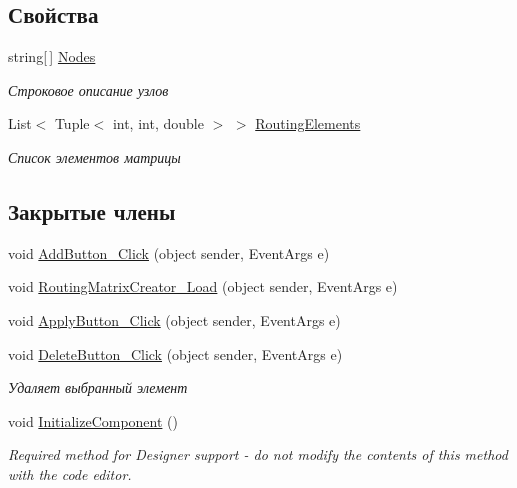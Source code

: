 \subsection*{Свойства}
\begin{DoxyCompactItemize}
\item 
string\mbox{[}$\,$\mbox{]} \hyperlink{class_desktop_network_analyzator_1_1_routing_matrix_creator_a3814334afe7686918cfe53e19464a3a7}{Nodes}
\begin{DoxyCompactList}\small\item\em Строковое описание узлов \end{DoxyCompactList}\item 
List$<$ Tuple$<$ int, int, double $>$ $>$ \hyperlink{class_desktop_network_analyzator_1_1_routing_matrix_creator_ad3dfc8b1d4eb526017b4515003533186}{Routing\+Elements}
\begin{DoxyCompactList}\small\item\em Список элементов матрицы \end{DoxyCompactList}\end{DoxyCompactItemize}
\subsection*{Закрытые члены}
\begin{DoxyCompactItemize}
\item 
void \hyperlink{class_desktop_network_analyzator_1_1_routing_matrix_creator_abee16260f87190b27f8e261a68592522}{Add\+Button\+\_\+\+Click} (object sender, Event\+Args e)
\item 
void \hyperlink{class_desktop_network_analyzator_1_1_routing_matrix_creator_a065d49ec813253c6af91e7f9747986d8}{Routing\+Matrix\+Creator\+\_\+\+Load} (object sender, Event\+Args e)
\item 
void \hyperlink{class_desktop_network_analyzator_1_1_routing_matrix_creator_a4ce2a70101ef4578e789317e10efa55a}{Apply\+Button\+\_\+\+Click} (object sender, Event\+Args e)
\item 
void \hyperlink{class_desktop_network_analyzator_1_1_routing_matrix_creator_aea6ab07d9cf85667f73bf63270b284fe}{Delete\+Button\+\_\+\+Click} (object sender, Event\+Args e)
\begin{DoxyCompactList}\small\item\em Удаляет выбранный элемент \end{DoxyCompactList}\item 
void \hyperlink{class_desktop_network_analyzator_1_1_routing_matrix_creator_ac69a8c5f3cb68beb05debee168d20ced}{Initialize\+Component} ()
\begin{DoxyCompactList}\small\item\em Required method for Designer support -\/ do not modify the contents of this method with the code editor. \end{DoxyCompactList}\end{DoxyCompactItemize}
